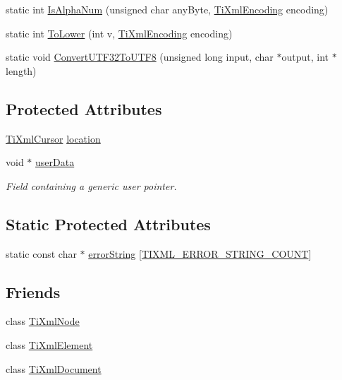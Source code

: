 \begin{DoxyCompactItemize}
\item 
static int \hyperlink{class_ti_xml_base_a321919055c115c78ded17f85a793f368}{Is\+Alpha\+Num} (unsigned char any\+Byte, \hyperlink{tinyxml_8h_a88d51847a13ee0f4b4d320d03d2c4d96}{Ti\+Xml\+Encoding} encoding)
\item 
static int \hyperlink{class_ti_xml_base_a799f17405a86a5c2029618e85f11a097}{To\+Lower} (int v, \hyperlink{tinyxml_8h_a88d51847a13ee0f4b4d320d03d2c4d96}{Ti\+Xml\+Encoding} encoding)
\item 
static void \hyperlink{class_ti_xml_base_a07c765e3a7f979d343e646ea797b180b}{Convert\+U\+T\+F32\+To\+U\+T\+F8} (unsigned long input, char $\ast$output, int $\ast$length)
\end{DoxyCompactItemize}
\subsection*{Protected Attributes}
\begin{DoxyCompactItemize}
\item 
\hyperlink{struct_ti_xml_cursor}{Ti\+Xml\+Cursor} \hyperlink{class_ti_xml_base_a0d992580f3bc264909f898e942677a3c}{location}
\item 
void $\ast$ \hyperlink{class_ti_xml_base_ab242c01590191f644569fa89a080d97c}{user\+Data}
\begin{DoxyCompactList}\small\item\em Field containing a generic user pointer. \end{DoxyCompactList}\end{DoxyCompactItemize}
\subsection*{Static Protected Attributes}
\begin{DoxyCompactItemize}
\item 
static const char $\ast$ \hyperlink{class_ti_xml_base_a7ac8feec4100e446b3d78e1ac0659700}{error\+String} \mbox{[}\hyperlink{class_ti_xml_base_a9a7e9344415956ab96e8c75f6a0bbd48a14552894942250efcec6b00dc52fc48a}{T\+I\+X\+M\+L\+\_\+\+E\+R\+R\+O\+R\+\_\+\+S\+T\+R\+I\+N\+G\+\_\+\+C\+O\+U\+NT}\mbox{]}
\end{DoxyCompactItemize}
\subsection*{Friends}
\begin{DoxyCompactItemize}
\item 
class \hyperlink{class_ti_xml_base_a218872a0d985ae30e78c55adc4bdb196}{Ti\+Xml\+Node}
\item 
class \hyperlink{class_ti_xml_base_ab6592e32cb9132be517cc12a70564c4b}{Ti\+Xml\+Element}
\item 
class \hyperlink{class_ti_xml_base_a173617f6dfe902cf484ce5552b950475}{Ti\+Xml\+Document}
\end{DoxyCompactItemize}


